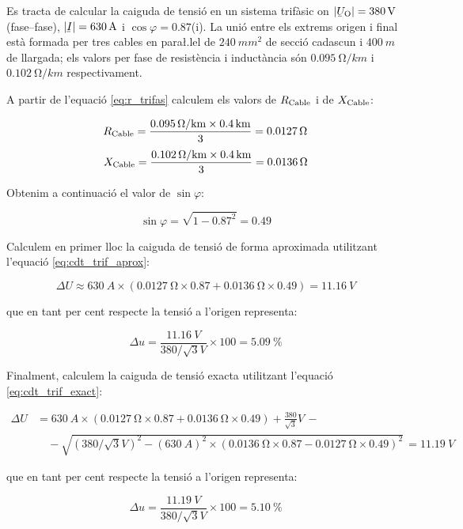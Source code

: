 \begin{exemple}
       Es tracta de calcular la caiguda de tensi\'{o} en un sistema trif\`{a}sic on $|\cmplx{U}\ped{O}| = \SI{380}{V}$ (fase--fase), $|\cmplx{I}|=\SI{630}{A}$ i $\cos \varphi = \num{0,87}$(i). La uni\'{o} entre els extrems origen  i final est\`{a} formada per tres cables en para{\l.l}el de $\SI{240}{mm^2}$ de secci\'{o} cadascun i $\SI{400}{m}$ de llargada; els valors per fase de resist\`{e}ncia i induct\`{a}ncia s\'{o}n $\SI{0,095}{\ohm/km}$ i $\SI{0,102}{\ohm/km}$ respectivament.

    A partir de l'equaci\'{o} \eqref{eq:r_trifas} calculem els valors de $R_\mathrm{Cable}$ i de $X_\mathrm{Cable}$:

    \[
       R_\mathrm{Cable} = \frac{\SI{0,095}{\ensuremath{\mathrm{\Omega}}/km}\times \SI{0,4}{km}}{3} = \SI{0,0127}{\ensuremath{\mathrm{\Omega}}}
    \]
    \[
       X_\mathrm{Cable} = \frac{\SI{0,102}{\ensuremath{\mathrm{\Omega}}/km}\times \SI{0,4}{km}}{3} = \SI{0,0136}{\ensuremath{\mathrm{\Omega}}}
    \]

    Obtenim a continuaci\'{o} el valor de $\sin \varphi$:

    \[
       \sin \varphi = \sqrt{1-\num{0,87}^2} = \num{0,49}
    \]

    Calculem en primer lloc la caiguda de tensi\'{o} de forma aproximada utilitzant l'equaci\'{o} \eqref{eq:cdt_trif_aprox}:

    \[
       \Delta U \approx \SI{630}{A} \times ( \SI{0,0127}{\ohm} \times \num{0,87} + \SI{0,0136}{\ohm} \times \num{0,49} ) = \SI{11,16}{V}
    \]

    que en tant per cent respecte la tensi\'{o} a l'origen representa:

    \[
        \Delta u = \frac{\SI{11,16}{V}}{380/\sqrt{3}\unit{V}} \times 100 = \SI{5,09}{\%}
    \]

    Finalment, calculem la caiguda de tensi\'{o} exacta utilitzant l'equaci\'{o} \eqref{eq:cdt_trif_exact}:

    \[ \begin{split}
       \Delta U &=  \SI{630}{A} \times( \SI{0,0127}{\ohm} \times \num{0,87} + \SI{0,0136}{\ohm} \times \num{0,49}) + \frac{380}{\sqrt{3}}\unit{V} \,- \\
        & \quad - \sqrt{\left(380/\sqrt{3}\unit{V}\right)^2 - \left(\SI{630}{A}\right)^2 \times  \left( \SI{0,0136}{\ohm} \times \num{0,87} - \SI{0,0127}{\ohm} \times \num{0,49} \right)^2 } \,= \SI{11,19}{V}
    \end{split} \]

    que en tant per cent respecte la tensi\'{o} a l'origen representa:

    \[
        \Delta u = \frac{\SI{11,19}{V}}{380/\sqrt{3}\unit{V}} \times 100 = \SI{5,10}{\%}
    \]
\end{exemple}


